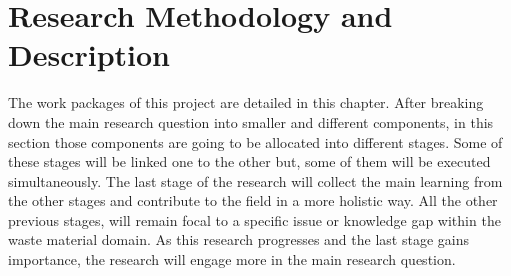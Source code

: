\chapter{Research Methodology and Description}
The work packages of this project are detailed in this chapter. After breaking down the main research question into smaller and different components, in this section those components are going to be allocated into different stages. Some of these stages will be linked one to the other but, some of them will be executed simultaneously. The last stage of the research will collect the main learning from the other stages and contribute to the field in a more holistic way. All the other previous stages, will remain focal to a specific issue or knowledge gap within the waste material domain. As this research progresses and the last stage gains importance, the research will engage more in the main research question.




